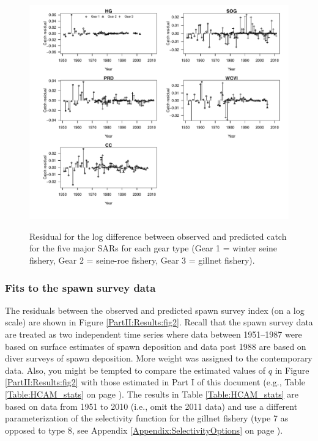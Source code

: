 \begin{figure}[!tbp]
	\includegraphics[width=\textwidth]{../FIGS/qPriorFigs/iscam_fig_catchresid.pdf}\\
	\caption{Residual for the log difference between observed and predicted catch for the five major SARs for each gear type (Gear 1 = winter seine fishery, Gear 2 = seine-roe fishery, Gear 3 = gillnet fishery).}\label{PartII:Results:fig1}
\end{figure}


\subsubsection{Fits to the spawn survey data}
The residuals between the observed and predicted spawn survey index (on a log scale) are shown in Figure \ref{PartII:Results:fig2}.  Recall that the spawn survey data are treated as two independent time series where data between 1951--1987 were based on surface estimates of spawn deposition and data post 1988 are based on diver surveys of spawn deposition.  More weight was assigned to the contemporary data.  Also, you might be tempted to compare the estimated values of $q$ in Figure \ref{PartII:Results:fig2} with those estimated in Part I of this document (e.g., Table \ref{Table:HCAM_stats} on page \pageref{Table:HCAM_stats}).  The results in Table \ref{Table:HCAM_stats} are based on data from 1951 to 2010 (i.e., omit the 2011 data) and use a different parameterization of the selectivity function for the gillnet fishery (type 7 as opposed to type 8, see Appendix \ref{Appendix:SelectivityOptions} on page \pageref{Appendix:SelectivityOptions}).

